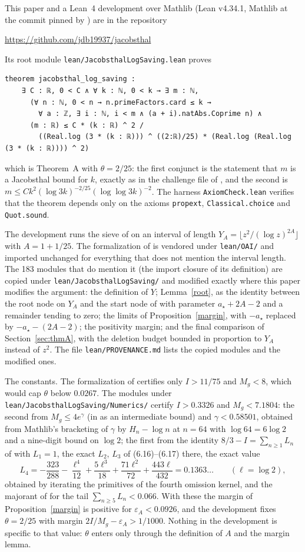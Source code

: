 \documentclass[11pt]{amsart}
\newcommand{\repourl}{https://github.com/jdb19937/jacobsthal}
\newcommand{\Mg}{M_g}
\newcommand{\astar}{a_\star}
\newcommand{\eps}{\varepsilon}
\begin{document}
This paper and a Lean~4 development over Mathlib (Lean v4.34.1, Mathlib at the commit pinned by \cite{OAI}) are in the repository
\begin{center}\url{\repourl}\end{center}
Its root module \texttt{lean/JacobsthalLogSaving.lean} proves
\begin{lstlisting}
theorem jacobsthal_log_saving :
    ∃ C : ℝ, 0 < C ∧ ∀ k : ℕ, 0 < k → ∃ m : ℕ,
      (∀ n : ℕ, 0 < n → n.primeFactors.card ≤ k →
        ∀ a : ℤ, ∃ i : ℕ, i < m ∧ (a + i).natAbs.Coprime n) ∧
      (m : ℝ) ≤ C * (k : ℝ) ^ 2 /
        ((Real.log (3 * (k : ℝ))) ^ ((2:ℝ)/25) * (Real.log (Real.log (3 * (k : ℝ)))) ^ 2)
\end{lstlisting}
which is Theorem~A with $\theta=2/25$: the first conjunct is the statement that $m$ is a Jacobsthal bound for $k$, exactly as in the challenge file of \cite{OAI}, and the second is $m\le Ck^2(\log3k)^{-2/25}(\log\log3k)^{-2}$. The harness \texttt{AxiomCheck.lean} verifies that the theorem depends only on the axioms \texttt{propext}, \texttt{Classical.choice} and \texttt{Quot.sound}.

The development runs the sieve of \cite{OAI} on an interval of length $Y_A=\lfloor z^2/(\log z)^{2A}\rfloor$ with $A=1+1/25$. The formalization of \cite{OAI} is vendored under \texttt{lean/OAI/} and imported unchanged for everything that does not mention the interval length. The 183 modules that do mention it (the import closure of its definition) are copied under \texttt{lean/JacobsthalLogSaving/} and modified exactly where this paper modifies the argument: the definition of $Y$; Lemma~\ref{root}, as the identity between the root node on $Y_A$ and the start node of \cite{OAI} with parameter $\astar+2A-2$ and a remainder tending to zero; the limits of Proposition~\ref{margin}, with $-\astar$ replaced by $-\astar-(2A-2)$; the positivity margin; and the final comparison of Section~\ref{sec:thmA}, with the deletion budget bounded in proportion to $Y_A$ instead of $z^2$. The file \texttt{lean/PROVENANCE.md} lists the copied modules and the modified ones.

The constants. The formalization of \cite{OAI} certifies only $I>11/75$ and $\Mg<8$, which would cap $\theta$ below $0.0267$. The modules under \texttt{lean/JacobsthalLogSaving/Numerics/} certify $I>0.3326$ and $\Mg<7.1804$: the second from $\Mg\le4e^\gamma$ (in \cite{OAI} as an intermediate bound) and $\gamma<0.58501$, obtained from Mathlib's bracketing of $\gamma$ by $H_n-\log n$ at $n=64$ with $\log64=6\log2$ and a nine-digit bound on $\log2$; the first from the identity $8/3-I=\sum_{n\ge1}L_n$ of \cite{OAI} with $L_1=1$, the exact $L_2$, $L_3$ of (6.16)--(6.17) there, the exact value
\[
L_4=-\frac{323}{288}-\frac{\ell^4}{12}+\frac{5\ell^3}{18}+\frac{71\ell^2}{72}+\frac{443\ell}{432}=0.1363\ldots\qquad(\ell=\log2),
\]
obtained by iterating the primitives of the fourth omission kernel, and the majorant of \cite{OAI} for the tail $\sum_{n\ge5}L_n<0.066$. With these the margin of Proposition~\ref{margin} is positive for $\eps_A<0.0926$, and the development fixes $\theta=2/25$ with margin $2I/\Mg-\eps_A>1/1000$. Nothing in the development is specific to that value: $\theta$ enters only through the definition of $A$ and the margin lemma.
\end{document}
